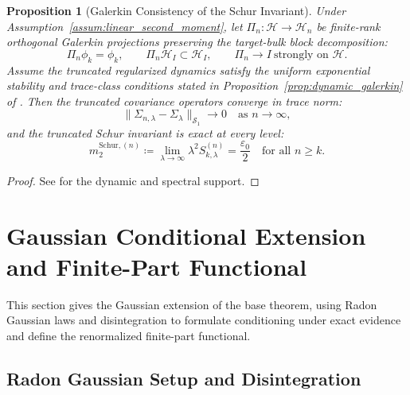 \documentclass[11pt]{amsart}
\theoremstyle{plain}
\newtheorem{proposition}[theorem]{Proposition}
\theoremstyle{definition}
\theoremstyle{remark}
\begin{document}
    \begin{proposition}[Galerkin Consistency of the Schur Invariant]
        \label{prop:galerkin_consistency}
        Under Assumption~\ref{assum:linear_second_moment}, let $\Pi_n:\mathcal{H}\to\mathcal{H}_n$ be finite-rank orthogonal Galerkin projections preserving the target-bulk block decomposition:
        \begin{equation}
            \Pi_n\phi_k=\phi_k,\qquad \Pi_n\mathcal{H}_I\subset\mathcal{H}_I,\qquad \Pi_n\to I\ \text{strongly on }\mathcal{H}.
        \end{equation}
        Assume the truncated regularized dynamics satisfy the uniform exponential stability and trace-class conditions stated in Proposition~\ref{prop:dynamic_galerkin} of .  Then the truncated covariance operators converge in trace norm:
        \begin{equation}
            \|\Sigma_{n,\lambda}-\Sigma_\lambda\|_{\mathcal{S}_1}\to0\quad\text{as }n\to\infty,
        \end{equation}
        and the truncated Schur invariant is exact at every level:
        \begin{equation}
            m_2^{\mathrm{Schur},(n)} \coloneqq \lim_{\lambda\to\infty} \lambda^2 S_{k,\lambda}^{(n)} = \frac{\varepsilon_0}{2} \quad \text{for all } n \ge k.
        \end{equation}
    \end{proposition}
    \begin{proof}
        See  for the dynamic and spectral support.
    \end{proof}

    \section{Gaussian Conditional Extension and Finite-Part Functional}
    \label{sec:gaussian_zero}

    This section gives the Gaussian extension of the base theorem, using Radon Gaussian laws and disintegration to formulate conditioning under exact evidence and define the renormalized finite-part functional.

    \subsection{Radon Gaussian Setup and Disintegration}
    \label{sec:gaussian:setup}
\end{document}
